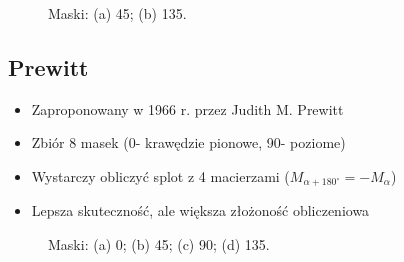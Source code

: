 \documentclass[a4paper,twocolumn,12pt]{article}
\begin{document}
\begin{figure}[!ht]
 \begin{center}
 \end{center}
 \caption{
  Maski:
  (a) 45\textdegree;
  (b) 135\textdegree.
 }
 \label{fig:roberts_matrices}
\end{figure}


\subsection{Prewitt}

\begin{itemize}
 \item Zaproponowany w 1966 r. przez Judith M. Prewitt
 \item Zbiór 8 masek (0\textdegree - krawędzie pionowe, 90\textdegree - poziome)
 \item Wystarczy obliczyć splot z 4 macierzami ($M_{\alpha+180^\circ} = -M_\alpha$)
 \item Lepsza skuteczność, ale większa złożoność obliczeniowa
\end{itemize}

\begin{figure}[!ht]
 \begin{center}
 \end{center}
 \caption{
  Maski:
  (a) 0\textdegree;
  (b) 45\textdegree;
  (c) 90\textdegree;
  (d) 135\textdegree.
 }
 \label{fig:prewitt_matrices}
\end{figure}
\end{document}
